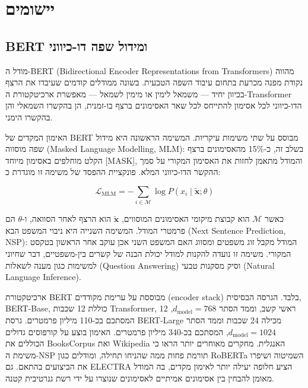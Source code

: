 \chapter{יישומים}

\section{\textenglish{BERT} ומידול שפה דו-כיווני}

מודל ה-\textenglish{BERT} (\textenglish{Bidirectional Encoder Representations from Transformers}) \cite{devlin2019bert}
מהווה נקודת מפנה מכרעת בתחום עיבוד השפה הטבעית. בשונה ממודלים קודמים שעיבדו את הרצף בכיוון יחיד --- משמאל לימין או מימין לשמאל --- מאפשרת ארכיטקטורת ה-\textenglish{Transformer} הדו-כיווני לכל אסימון להתייחס לכל שאר האסימונים ברצף בו-זמנית, הן בהקשרו השמאלי והן בהקשרו הימני.

האימון המקדים של \textenglish{BERT} מבוסס על שתי משימות עיקריות. המשימה הראשונה היא מידול שפה מוסווה (\textenglish{Masked Language Modelling}, \textenglish{MLM}): בשלב זה, כ-15\% מהאסימונים ברצף הקלט מוחלפים באסימון מיוחד \textenglish{[MASK]}, והמודל מתאמן לחזות את האסימון המקורי על סמך ההקשר הדו-כיווני המלא. פונקציית ההפסד של משימה זו מוגדרת כ:

\begin{equation}
\mathcal{L}_{\text{MLM}} = -\sum_{i \in \mathcal{M}} \log P\!\left(x_i \mid \tilde{\mathbf{x}}; \theta\right)
\end{equation}

כאשר \(\mathcal{M}\) הוא קבוצת מיקומי האסימונים המוסווים, \(\tilde{\mathbf{x}}\) הוא הרצף לאחר הסוואה, ו-\(\theta\) הם פרמטרי המודל. המשימה השנייה היא ניבוי המשפט הבא (\textenglish{Next Sentence Prediction}, \textenglish{NSP}): המודל מקבל זוג משפטים ומסווג האם המשפט השני אכן עוקב אחר הראשון בטקסט המקורי. משימה זו נועדה להקנות למודל יכולת הבנה של קשרים בין-משפטיים, דבר שחיוני למשימות כגון מענה לשאלות (\textenglish{Question Answering}) וסיק מסקנות טבעי (\textenglish{Natural Language Inference}).

ארכיטקטורת \textenglish{BERT} מבוססת על ערימת מקודדים (\textenglish{encoder stack}) בלבד. הגרסה הבסיסית, \textenglish{BERT-Base}, כוללת 12 שכבות \textenglish{Transformer}, 12 ראשי קשב, וממד הסתר \(d_{\text{model}} = 768\), המסתכם בכ-110 מיליון פרמטרים. גרסת \textenglish{BERT-Large} מכילה 24 שכבות וממד הסתר \(d_{\text{model}} = 1024\), המסתכם בכ-340 מיליון פרמטרים. האימון בוצע על קורפוסים גדולים הכוללים את \textenglish{BooksCorpus} ואת \textenglish{Wikipedia} האנגלית. מחקרים מאוחרים יותר הראו כי משימת ה-\textenglish{NSP} תורמת פחות ממה שהניחו תחילה, ומודלים כגון \textenglish{RoBERTa} השמיטוה ושיפרו את הביצועים בהתאם. גם \textenglish{ELECTRA} \cite{clark2020electra} הציע חלופה יעילה יותר לאימון מקדים, בה המודל מאומן להבחין בין אסימונים אמיתיים לאסימונים שנוצרו על ידי רשת גנרטיבית קטנה.

